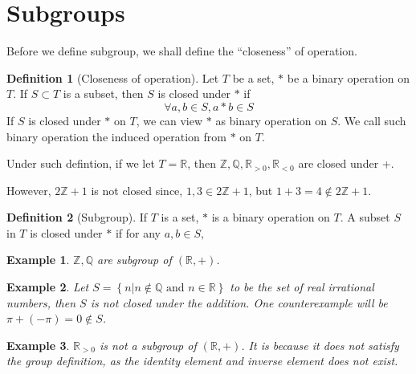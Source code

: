 \documentclass{article}
\theoremstyle{MyNonumberplain}
\theoremstyle{break}
\theoremstyle{break}
\newtheorem{example}{Example}[section]
\theoremstyle{break}
\theoremstyle{definition}
\theoremstyle{break}
\newtheorem{definition}{Definition}[section]
\begin{document}
\newpage

\section{Subgroups}

Before we define subgroup, we shall define the ``closeness'' of operation.

\begin{defbox}
    \begin{definition}[Closeness of operation]
        Let $T$ be a set, $*$ be a binary operation on $T$. If $S\subset T$ is a subset, then $S$ is closed under $*$ if 
        $$\forall a,b\in S, a*b\in S$$
        If $S$ is closed under $\ast$ on $T$, we can view $\ast$ as binary operation on $S$. We call such binary operation the induced operation from $\ast$ on
$T$.
    \end{definition}
\end{defbox}

Under such defintion, if we let $T =\mathbb{R}$, then $\mathbb{Z}, \mathbb{Q},
\mathbb{R}_{> 0}, \mathbb{R}_{< 0}$ are closed under +.

However, $2\mathbb{Z}+ 1$ is not closed since, $1, 3 \in 2\mathbb{Z}+ 1$, but $1 + 3 = 4 \not\in 2\mathbb{Z}+ 1$.

\begin{defbox}
    \begin{definition}[Subgroup]
        If $T$ is a set, $*$ is a binary operation on $T$.\bigskip
        A subset $S$ in $T$ is closed under $*$ if for any $a,b\in S,$
    \end{definition}
\end{defbox}

\begin{expbox}
    \begin{example}
        $\mathbb{Z}, \mathbb{Q}$ are subgroup of $(\mathbb{R}, +)$.
    \end{example}
\end{expbox}

\begin{expbox}
    \begin{example}
        Let $S = \left\{ n|n \not\in \mathbb{Q} \text{ and } n \in \mathbb{R}
\right\}$ to be the set of real irrational numbers, then $S$ is not closed
under the addition. One counterexample will be $\pi + (- \pi) = 0 \not\in
S$.
    \end{example}
\end{expbox}

\begin{expbox}
    \begin{example}
        $\mathbb{R}_{> 0}$ is not a subgroup of $(\mathbb{R}, +)$. It is because
        it does not satisfy the group definition, as the identity element and inverse
        element does not exist.
    \end{example}
\end{expbox}
\end{document}

